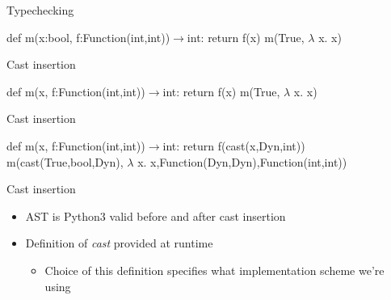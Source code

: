 \documentclass[mathserif]{beamer}
\begin{document}
\addtocounter{framenumber}{-1}
\begin{frame}{Typechecking}
 \begin{algorithmic}[2]
    \State def m(x:bool, f:Function(int,int))$\to$int:
    \State \;\;\;return {\color{red}f(x)}
    \State 
    \State m(True, $\lambda$ x. x)
  \end{algorithmic}
\end{frame}

\begin{frame}{Cast insertion}
 \begin{algorithmic}[2]
    \State def m(x, f:Function(int,int))$\to$int:
    \State \;\;\;return f(x)
    \State 
    \State m(True, $\lambda$ x. x)
    \State
  \end{algorithmic}
\end{frame}

\addtocounter{framenumber}{-1}
\begin{frame}{Cast insertion}
 \begin{algorithmic}[2]
    \State def m(x, f:Function(int,int))$\to$int:
    \State \;\;\;return f({\color{blue}cast(}x{\color{blue},Dyn,int)})
    \State 
    \State m({\color{blue}cast(}True{\color{blue},bool,Dyn)}, 
    \State \;$\lambda$ x. x{\color{blue},Function(Dyn,Dyn),Function(int,int)})
  \end{algorithmic}
\end{frame}

\begin{frame}{Cast insertion}
  \begin{itemize}
  \item AST is Python3 valid before and after cast insertion
  \item Definition of \textit{cast} provided at runtime
    \begin{itemize}
    \item Choice of this definition specifies what implementation scheme we're using
    \end{itemize}
  \end{itemize}
\end{frame}
\end{document}
